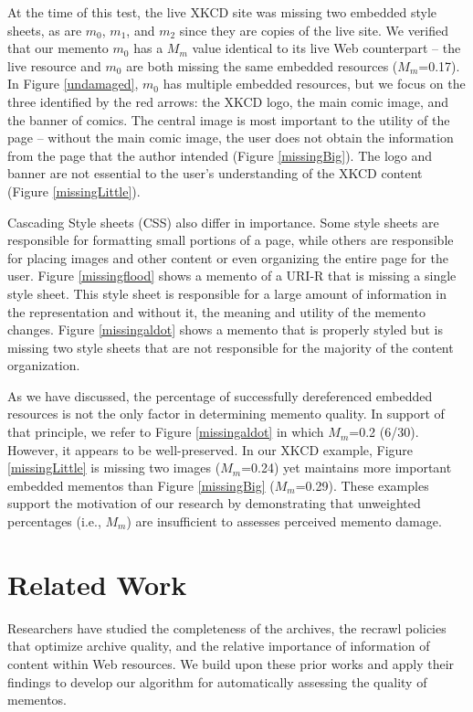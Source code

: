 At the time of this test, the live XKCD site was missing two embedded style sheets, as are $m_0$, $m_1$, and $m_2$ since they are copies of the live site. We verified that our memento $m_0$ has a $M_m$ value identical to its live Web counterpart -- the live resource and $m_0$ are both missing the same embedded resources ($M_m$=0.17). In Figure \ref{undamaged}, $m_0$ has multiple embedded resources, but we focus on the three identified by the red arrows: the XKCD logo, the main comic image, and the banner of comics. The central image is most important to the utility of the page -- without the main comic image, the user does not obtain the information from the page that the author intended (Figure \ref{missingBig}). The logo and banner are not essential to the user's understanding of the XKCD content (Figure \ref{missingLittle}). 

Cascading Style sheets (CSS) also differ in importance. Some style sheets are responsible for formatting small portions of a page, while others are responsible for placing images and other content or even organizing the entire page for the user. Figure \ref{missingflood} shows a memento of a URI-R that is missing a single style sheet. This style sheet is responsible for a large amount of information in the representation and without it, the meaning and utility of the memento changes. Figure \ref{missingaldot} shows a memento that is properly styled but is missing two style sheets that are not responsible for the majority of the content organization.%

As we have discussed, the percentage of successfully dereferenced embedded resources is not the only factor in determining memento quality. In support of that principle, we refer to Figure \ref{missingaldot} in which $M_m$=0.2 (6/30). However, it appears to be well-preserved. In our XKCD example, Figure \ref{missingLittle} is missing two images ($M_m$=0.24) yet maintains more important embedded mementos than Figure \ref{missingBig} ($M_m$=0.29). These examples support the motivation of our research by demonstrating that unweighted percentages (i.e., $M_m$) are insufficient to assesses perceived memento damage.


\section{Related Work}
\label{priorwork}
Researchers have studied the completeness of the archives, the recrawl policies that optimize archive quality, and the relative importance of information of content within Web resources. We build upon these prior works and apply their findings to develop our algorithm for automatically assessing the quality of mementos.

